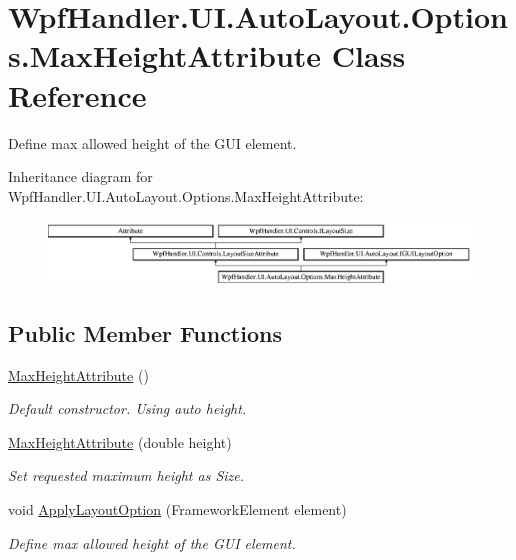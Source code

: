 \hypertarget{class_wpf_handler_1_1_u_i_1_1_auto_layout_1_1_options_1_1_max_height_attribute}{}\section{Wpf\+Handler.\+U\+I.\+Auto\+Layout.\+Options.\+Max\+Height\+Attribute Class Reference}
\label{class_wpf_handler_1_1_u_i_1_1_auto_layout_1_1_options_1_1_max_height_attribute}


Define max allowed height of the G\+UI element.  


Inheritance diagram for Wpf\+Handler.\+U\+I.\+Auto\+Layout.\+Options.\+Max\+Height\+Attribute\+:\begin{figure}[H]
\begin{center}
\leavevmode
\includegraphics[height=1.707317cm]{d8/d31/class_wpf_handler_1_1_u_i_1_1_auto_layout_1_1_options_1_1_max_height_attribute}
\end{center}
\end{figure}
\subsection*{Public Member Functions}
\begin{DoxyCompactItemize}
\item 
\mbox{\hyperlink{class_wpf_handler_1_1_u_i_1_1_auto_layout_1_1_options_1_1_max_height_attribute_af8c796ee4a1ea70d91249014f9c59117}{Max\+Height\+Attribute}} ()
\begin{DoxyCompactList}\small\item\em Default constructor. Using auto height. \end{DoxyCompactList}\item 
\mbox{\hyperlink{class_wpf_handler_1_1_u_i_1_1_auto_layout_1_1_options_1_1_max_height_attribute_af504388049b3db7acbc4e0a340014127}{Max\+Height\+Attribute}} (double height)
\begin{DoxyCompactList}\small\item\em Set requested maximum height as Size. \end{DoxyCompactList}\item 
void \mbox{\hyperlink{class_wpf_handler_1_1_u_i_1_1_auto_layout_1_1_options_1_1_max_height_attribute_a1b1d850c2c5d8e59454d7f9b5271ee88}{Apply\+Layout\+Option}} (Framework\+Element element)
\begin{DoxyCompactList}\small\item\em Define max allowed height of the G\+UI element. \end{DoxyCompactList}\end{DoxyCompactItemize}
